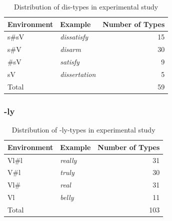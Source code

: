 \begin{table}[h!]
	\caption{Distribution of dis-types in experimental study}
	\label{tbl:distribution of dis types in experiment}

	\begin{center}
		\begin{tabular} {llr}

			Environment & Example & Number of  Types\\

			\hline
			s\#sV&\color[HTML]{3166FF}\textit{dissatisfy} & 15 \\ 
			s\#V&\color[HTML]{3166FF}\textit{disarm} & 30\\ 
			\#sV&\color[HTML]{3166FF}\textit{satisfy} & 9\\ 
			sV&\color[HTML]{3166FF}\textit{dissertation} & 5 \\ 
			\hline   	
			Total&  & 59\\ 
			\hline   	


		\end{tabular}
	\end{center}
\end{table}



\subsubsection{-ly} \label{stimuli ly}


\begin{table}[b!]
	\caption{Distribution of -ly-types in experimental study}
	\label{tbl:distribution of ly types in experiment}
	
	\begin{center}
		\begin{tabular} {llr}
			
			Environment & Example & Number of  Types\\
			\hline
			Vl\#l &\color[HTML]{3166FF}\textit{really} & 31 \\ 
			V\#l &\color[HTML]{3166FF}\textit{truly} & 30 \\ 
			Vl\# &\color[HTML]{3166FF}\textit{real} & 31\\ 
			Vl &\color[HTML]{3166FF}\textit{belly} & 11\\ 
			\hline   	
			Total&  & 103 \\ 
			\hline   	
			
		\end{tabular}
	\end{center}
\end{table}




